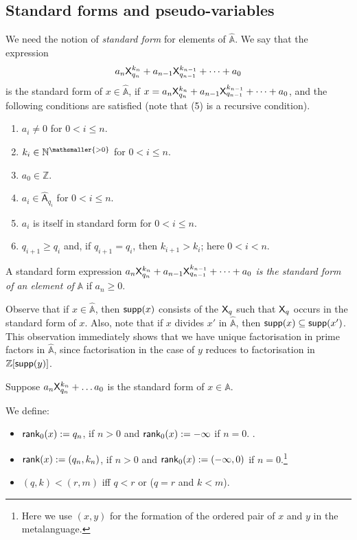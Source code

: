 \documentclass{amsart}
\renewcommand{\leq}{\leqslant}
\renewcommand{\geq}{\geqslant}
\newcommand{\X}{{\sf X}}
\begin{document}
\subsection{Standard forms and pseudo-variables}
We need the notion of \emph{standard form} for elements of $\hat{\mathbb{A}}$. We say that the expression $$a_n\X_{q_n}^{k_n} + a_{n-1}\X_{q_{n-1}}^{k_{n-1}} + \dots +a_0$$ is the standard form of $x\in\hat{\mathbb{A}}$, if $x=a_n\X_{q_n}^{k_n} + a_{n-1}\X_{q_{n-1}}^{k_{n-1}} + \dots +a_0$, and the following conditions are satisfied (note that (5) is a recursive condition). 

\begin{enumerate}[$1$.]
\item $a_i \neq 0$ for $0<i\leq n$.
\item $k_i\in \mathbb{N}^{\mathsmaller{>0}}$ for $0<i\leq n$.
\item
$a_0 \in \mathbb{Z}$. 
\item $a_i\in \hat{\mathsf{A}}_{q_i}$ for $0<i\leq n$.
 \item  $a_i$ is itself in standard form for $0<i\leq n$.
 \item  $q_{i+1} \geq q_i$ and, if
$q_{i+1}=q_i$, then $k_{i+1} > k_i$; here $0<i<n.$
\end{enumerate}

    A standard form expression $a_n\X_{q_n}^{k_n} + a_{n-1}\X_{q_{n-1}}^{k_{n-1}} + \dots +a_0$
    \emph{is the standard form of an element of} $\mathbb{A}$ if $a_n\geq 0$.

\noindent
Observe that if $x\in\hat{\mathbb{A}}$, then ${\sf supp}(x)$ consists of the $\X_q$ such that $\X_q$ occurs in the standard form of $x$. Also, note that if $x$ divides $x'$ in $\hat{\mathbb A}$, then ${\sf supp}(x)\subseteq {\sf supp}(x')$. 
This observation immediately shows that we have unique factorisation in prime factors in $\hat{\mathbb A}$,
since factorisation in the case of $y$ reduces to factorisation in $\mathbb Z[{\sf supp}(y)]$.

Suppose $a_n\X_{q_n}^{k_n}  + \dots a_0$ is the standard form of $x\in \mathbb{A}$. 

We define:
\begin{itemize}
\item
${\sf rank}_0(x) := q_n$, if $n>0$ and ${\sf rank}_0(x) := -\infty$ if $n=0$. .
\item
${\sf rank}(x) := (q_n,k_n)$, if 
$n>0$ and ${\sf rank}_0(x) := (-\infty,0)$ if $n=0$.\footnote{Here we use $(x,y)$ for the formation of the ordered pair of $x$ and $y$ in the metalanguage.}
\item
$(q,k) < (r,m)$ iff $q<r$ or ($q=r$ and $k<m$).
\end{itemize} 
 
\end{document}

